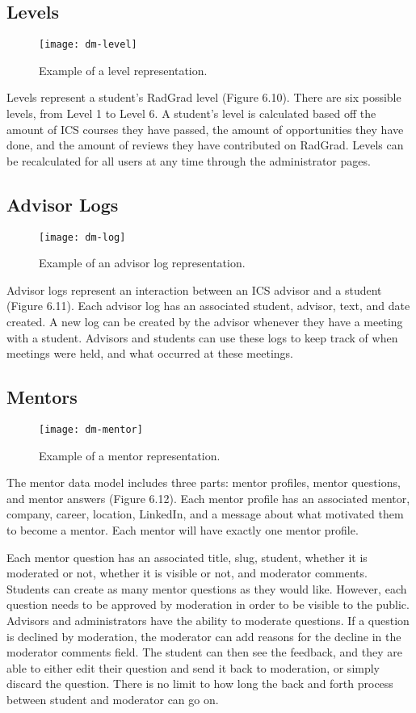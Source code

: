 \subsection{Levels}
\begin{figure}[h]
\centering
\texttt{[image: dm-level]}
\caption{Example of a level representation.}
\end{figure}
Levels represent a student's RadGrad level (Figure 6.10). There are six possible levels, from Level 1 to Level 6. A student's level is calculated based off the amount of ICS courses they have passed, the amount of opportunities they have done, and the amount of reviews they have contributed on RadGrad. Levels can be recalculated for all users at any time through the administrator pages.

\subsection{Advisor Logs}
\begin{figure}[h]
\centering
\texttt{[image: dm-log]}
\caption{Example of an advisor log representation.}
\end{figure}
Advisor logs represent an interaction between an ICS advisor and a student (Figure 6.11). Each advisor log has an associated student, advisor, text, and date created. A new log can be created by the advisor whenever they have a meeting with a student. Advisors and students can use these logs to keep track of when meetings were held, and what occurred at these meetings. 

\subsection{Mentors}
\begin{figure}[h]
\centering
\texttt{[image: dm-mentor]}
\caption{Example of a mentor representation.}
\end{figure}
The mentor data model includes three parts: mentor profiles, mentor questions, and mentor answers (Figure 6.12). Each mentor profile has an associated mentor, company, career, location, LinkedIn, and a message about what motivated them to become a mentor. Each mentor will have exactly one mentor profile.  

Each mentor question has an associated title, slug, student, whether it is moderated or not, whether it is visible or not, and moderator comments. Students can create as many mentor questions as they would like. However, each question needs to be approved by moderation in order to be visible to the public. Advisors and administrators have the ability to moderate questions. If a question is declined by moderation, the moderator can add reasons for the decline in the moderator comments field. The student can then see the feedback, and they are able to either edit their question and send it back to moderation, or simply discard the question. There is no limit to how long the back and forth process between student and moderator can go on. 

